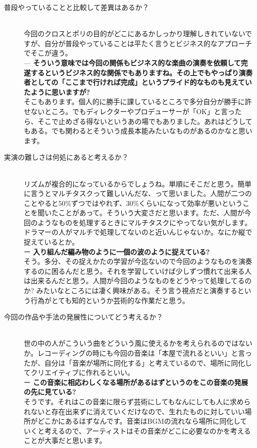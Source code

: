 \documentclass[uplatex,dvipdfmx]{ujarticle}
\begin{document}
\begin{description}
\item [普段やっていることと比較して差異はあるか？]\mbox{}\\

今回のクロスとポリの目的がどこにあるかしっかり理解しきれていないですが、自分が普段やっていることは平たく言うとビジネス的なアプローチでそこが違う。\\

--- {\bf そういう意味では今回の関係もビジネス的な楽曲の演奏を依頼して完遂するというビジネス的な関係でもありますね。その上でもやっぱり演奏者としての「ここまで行ければ完成」というプライド的なものも見えていたように思いますが?}\\

そこもあります。個人的に勝手に課しているところで多分自分が勝手に許せないところ。でもディレクターやプロデューサーが「OK」と言ったら、そこで止めざる得ないというあの場でもありました。あれはどうしてもある。でも関わるとそういう成長本能みたいなものがあるのかなと思います。\\

\item [実演の難しさは何処にあると考えるか？]\mbox{}\\

リズムが複合的になっているからでしょうね。単順にそこだと思う。簡単に言うとマルチタスクって難しいんだな、って思いました。人間が二つのことやると50\%ずつではやれず、30\%くらいになって効率が悪いということを聞いたことがあって。そういう大変さだと思います。ただ、人間が今回のようなものを処理するときにマルチタスクにやってない気がします。ドラマーの人がマルチで処理してないのと近いんじゃないか。なにか縦で捉えているとか。\\

ー {\bf 入り組んだ編み物のように一個の波のように捉えている?}\\

そう。多分、その捉えかたの学習が今迄ないので今回のようなものを演奏するのに困るんだと思う。それを学習していけば少しずつ慣れて出来る人は出来るんだと思う。人間が今回のようなものをどうやって処理してるのか? みたいなところには凄く興味がある。そう言う視点だと演奏するという行為がとても知的というか芸術的な作業だと思う。\\

\item [今回の作品や手法の発展性についてどう考えるか？]\mbox{}\\

世の中の人がこういう曲をどういう風に使えるかを考えられるのではないか。レコーディングの時にも今回の音楽は「本屋で流れるといい」と言ったが、自分は「音楽が場所に同化する」と考えているので、場所に同化してクリエイティブに作れるといい。\\

ー {\bf この音楽に相応わしくなる場所があるはずというのをこの音楽の発展の先に見ている?}\\

そうです。それはこの音楽に限らず芸術にしてもなんにしても人に求められないと存在出来ずに消えていくだけなので、生れたものに対していい場所がどこかにあるはずなんです。音楽はBGMの流れなら場所に同化していくと考えるので、アーティストはその音楽がどこに必要なのかを考えることが大事だと思います。
\end{description}
\end{document}
